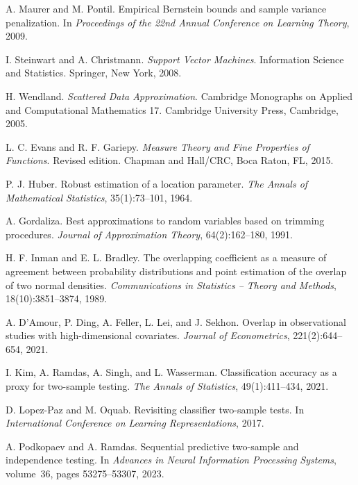 A. Maurer and M. Pontil.
\newblock Empirical {B}ernstein bounds and sample variance penalization.
\newblock In \emph{Proceedings of the 22nd Annual Conference on Learning Theory}, 2009.

I. Steinwart and A. Christmann.
\newblock \emph{Support Vector Machines}.
\newblock Information Science and Statistics. Springer, New York, 2008.

H. Wendland.
\newblock \emph{Scattered Data Approximation}.
\newblock Cambridge Monographs on Applied and Computational Mathematics 17. Cambridge University Press, Cambridge, 2005.

L. C. Evans and R. F. Gariepy.
\newblock \emph{Measure Theory and Fine Properties of Functions}.
\newblock Revised edition. Chapman and Hall/CRC, Boca Raton, FL, 2015.

P. J. Huber.
\newblock Robust estimation of a location parameter.
\newblock \emph{The Annals of Mathematical Statistics}, 35(1):73--101, 1964.

A. Gordaliza.
\newblock Best approximations to random variables based on trimming procedures.
\newblock \emph{Journal of Approximation Theory}, 64(2):162--180, 1991.

H. F. Inman and E. L. Bradley.
\newblock The overlapping coefficient as a measure of agreement between probability distributions and point estimation of the overlap of two normal densities.
\newblock \emph{Communications in Statistics -- Theory and Methods}, 18(10):3851--3874, 1989.

A. D'Amour, P. Ding, A. Feller, L. Lei, and J. Sekhon.
\newblock Overlap in observational studies with high-dimensional covariates.
\newblock \emph{Journal of Econometrics}, 221(2):644--654, 2021.

I. Kim, A. Ramdas, A. Singh, and L. Wasserman.
\newblock Classification accuracy as a proxy for two-sample testing.
\newblock \emph{The Annals of Statistics}, 49(1):411--434, 2021.

D. Lopez-Paz and M. Oquab.
\newblock Revisiting classifier two-sample tests.
\newblock In \emph{International Conference on Learning Representations}, 2017.

A. Podkopaev and A. Ramdas.
\newblock Sequential predictive two-sample and independence testing.
\newblock In \emph{Advances in Neural Information Processing Systems}, volume~36, pages 53275--53307, 2023.


